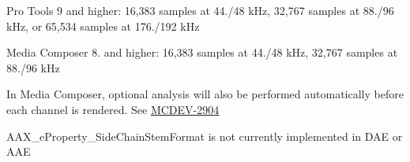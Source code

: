 \begin{DoxyRefList}
\begin{DoxyItemize}
\item Pro Tools 9 and higher\+: 16,383 samples at 44./48 k\+Hz, 32,767 samples at 88./96 k\+Hz, or 65,534 samples at 176./192 k\+Hz
\item Media Composer 8. and higher\+: 16,383 samples at 44./48 k\+Hz, 32,767 samples at 88./96 k\+Hz  
\end{DoxyItemize}
\item[Member \mbox{\hyperlink{a00674_a13e384f22825afd3db6d68395b79ce0da5a2bacb421fc36f890a121f01a9e72ba}{AAX\+\_\+e\+Property\+\_\+\+Optional\+Analysis}} ]\label{a00801__compatibility_notes000070}%
%
 In Media Composer, optional analysis will also be performed automatically before each channel is rendered. See \mbox{\hyperlink{a00862_MCDEV-2904}{MCDEV-\/2904}} 
\item[Member \mbox{\hyperlink{a00674_a13e384f22825afd3db6d68395b79ce0dae71ad10ce55fb8c4076fe70315b689ae}{AAX\+\_\+e\+Property\+\_\+\+Side\+Chain\+Stem\+Format}} ]\label{a00801__compatibility_notes000069}%
%
 AAX\+\_\+e\+Property\+\_\+\+Side\+Chain\+Stem\+Format is not currently implemented in DAE or AAE 


\end{DoxyRefList}
